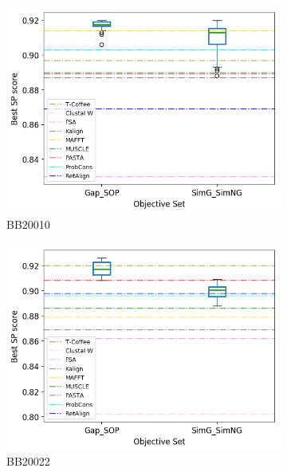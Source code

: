 \begin{figure}[!htbp]
\begin{adjustwidth}{-1cm}{-1cm}
\begin{subfigure}{0.22\textwidth}
			\includegraphics[width=\columnwidth]{Figure/summary/precomputedInit/Balibase/BB20010_objset_pairs_rank_2}
			\caption{BB20010}
		\end{subfigure}
		\begin{subfigure}{0.22\textwidth}
			\includegraphics[width=\columnwidth]{Figure/summary/precomputedInit/Balibase/BB20022_objset_pairs_rank_2}
			\caption{BB20022}
		\end{subfigure}
		\begin{subfigure}{0.22\textwidth}

\end{subfigure}
\end{adjustwidth}
\end{figure}
